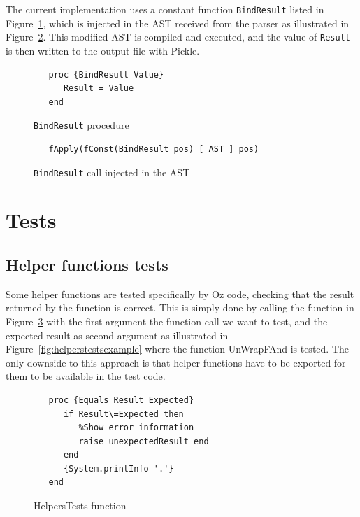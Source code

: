 \documentclass[a4paper]{memoir}
\begin{document}
The current implementation uses a constant function \lstinline!BindResult! listed
in Figure~\ref{fig:bindres}, 
which is injected in the AST received from the parser as illustrated in Figure~\ref{fig:bindresinj}.
This modified AST is compiled and executed, and the value of \lstinline!Result! 
is then written to the output file with Pickle.

\begin{figure}[h]
\begin{lstlisting}
   proc {BindResult Value}
      Result = Value
   end
\end{lstlisting}
\caption{\lstinline!BindResult! procedure}
\label{fig:bindres}
\end{figure}



\begin{figure}[h]
\begin{lstlisting}
   fApply(fConst(BindResult pos) [ AST ] pos)
\end{lstlisting}
\caption{\lstinline!BindResult! call injected in the AST}
\label{fig:bindresinj}
\end{figure}




\section{Tests}
\subsection{Helper functions tests}
Some helper functions are tested specifically by Oz code, checking that the result returned by the function is correct. This is simply done by calling the function in Figure~\ref{fig:helperstestsfunction} with the first argument the function call we want to test, and the expected result as second argument as illustrated in Figure~\ref{fig:helperstestsexample} where the function UnWrapFAnd is tested.
The only downside to this approach is that helper functions have to be exported for them to be available in the test code.

\begin{figure}
\begin{lstlisting}
   proc {Equals Result Expected}
      if Result\=Expected then
         %Show error information
         raise unexpectedResult end
      end
      {System.printInfo '.'}
   end
\end{lstlisting}
\caption{HelpersTests function}
\label{fig:helperstestsfunction}
\end{figure}
\end{document}
